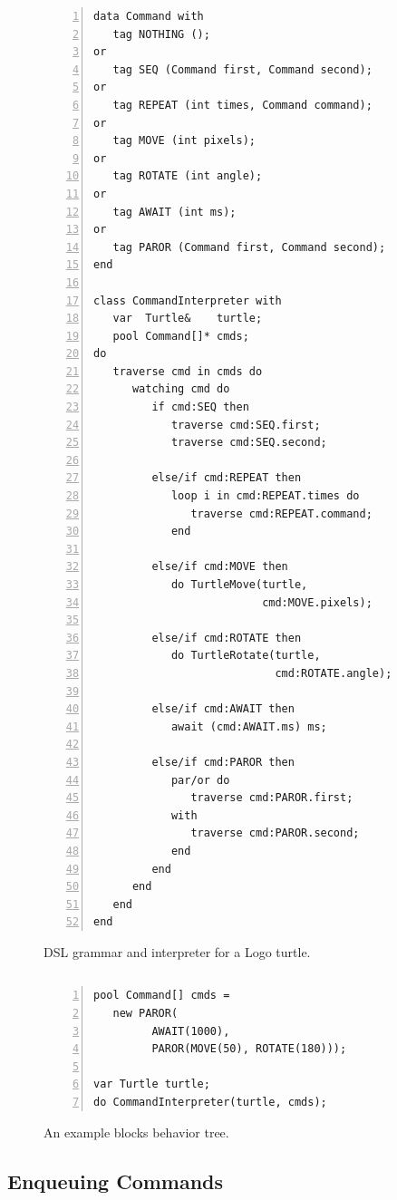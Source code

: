 \documentclass{sig-alternate}
\begin{document}
\begin{figure}[t]
\begin{lstlisting}[numbers=left,xleftmargin=3em]
data Command with
   tag NOTHING ();
or
   tag SEQ (Command first, Command second);
or
   tag REPEAT (int times, Command command);
or
   tag MOVE (int pixels);
or
   tag ROTATE (int angle);
or
   tag AWAIT (int ms);
or
   tag PAROR (Command first, Command second);
end

class CommandInterpreter with
   var  Turtle&    turtle;
   pool Command[]* cmds;
do
   traverse cmd in cmds do
      watching cmd do
         if cmd:SEQ then
            traverse cmd:SEQ.first;
            traverse cmd:SEQ.second;

         else/if cmd:REPEAT then
            loop i in cmd:REPEAT.times do
               traverse cmd:REPEAT.command;
            end

         else/if cmd:MOVE then
            do TurtleMove(turtle,
                          cmd:MOVE.pixels);

         else/if cmd:ROTATE then
            do TurtleRotate(turtle,
                            cmd:ROTATE.angle);

         else/if cmd:AWAIT then
            await (cmd:AWAIT.ms) ms;

         else/if cmd:PAROR then
            par/or do
               traverse cmd:PAROR.first;
            with
               traverse cmd:PAROR.second;
            end
         end
      end
   end
end
\end{lstlisting}
\caption{ DSL grammar and interpreter for a Logo turtle.
\label{lst.turtle}
}
\end{figure}

\begin{verbatim}
\end{verbatim}
\begin{figure}[t]
\begin{lstlisting}[numbers=left,xleftmargin=3em]
pool Command[] cmds =
   new PAROR(
         AWAIT(1000),
         PAROR(MOVE(50), ROTATE(180)));

var Turtle turtle;
do CommandInterpreter(turtle, cmds);
\end{lstlisting}
\caption{ An example blocks behavior tree.
\label{lst.turtle.example}
}
\end{figure}

\subsection{Enqueuing Commands}
\label{sub.enqueuing}
\end{document}
